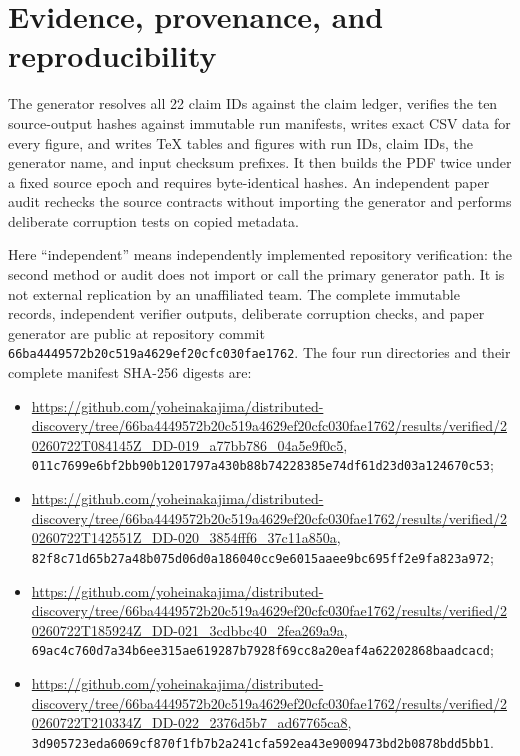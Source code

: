 \documentclass[12pt]{article}
\theoremstyle{definition}
\begin{document}
\section{Evidence, provenance, and reproducibility}

The generator resolves all 22 claim IDs against the claim ledger, verifies the
ten source-output hashes against immutable run manifests, writes exact CSV data
for every figure, and writes TeX tables and figures with run IDs, claim IDs, the
generator name, and input checksum prefixes. It then builds the PDF twice under
a fixed source epoch and requires byte-identical hashes. An independent paper
audit rechecks the source contracts without importing the generator and performs
deliberate corruption tests on copied metadata.

Here ``independent'' means independently implemented repository verification:
the second method or audit does not import or call the primary generator path.
It is not external replication by an unaffiliated team. The complete immutable
records, independent verifier outputs, deliberate corruption checks, and paper
generator are public at repository commit
\nolinkurl{66ba4449572b20c519a4629ef20cfc030fae1762}. The four run directories and
their complete manifest SHA-256 digests are:
\begin{itemize}[leftmargin=1.4em]
\item \url{https://github.com/yoheinakajima/distributed-discovery/tree/66ba4449572b20c519a4629ef20cfc030fae1762/results/verified/20260722T084145Z_DD-019_a77bb786_04a5e9f0c5},
  \nolinkurl{011c7699e6bf2bb90b1201797a430b88b74228385e74df61d23d03a124670c53};
\item \url{https://github.com/yoheinakajima/distributed-discovery/tree/66ba4449572b20c519a4629ef20cfc030fae1762/results/verified/20260722T142551Z_DD-020_3854fff6_37c11a850a},
  \nolinkurl{82f8c71d65b27a48b075d06d0a186040cc9e6015aaee9bc695ff2e9fa823a972};
\item \url{https://github.com/yoheinakajima/distributed-discovery/tree/66ba4449572b20c519a4629ef20cfc030fae1762/results/verified/20260722T185924Z_DD-021_3cdbbc40_2fea269a9a},
  \nolinkurl{69ac4c760d7a34b6ee315ae619287b7928f69cc8a20eaf4a62202868baadcacd};
\item \url{https://github.com/yoheinakajima/distributed-discovery/tree/66ba4449572b20c519a4629ef20cfc030fae1762/results/verified/20260722T210334Z_DD-022_2376d5b7_ad67765ca8},
  \nolinkurl{3d905723eda6069cf870f1fb7b2a241cfa592ea43e9009473bd2b0878bdd5bb1}.
\end{itemize}
\end{document}
